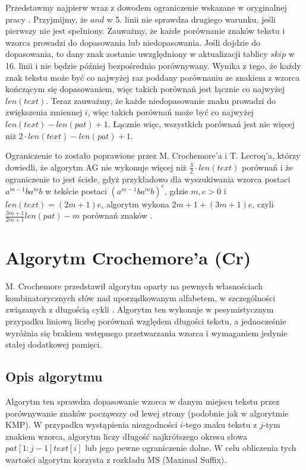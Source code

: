 Przedstawmy najpierw wraz z dowodem ograniczenie wskazane w oryginalnej pracy \cite{AG}. Przyjmijmy, że $and$ w 5. linii nie sprawdza drugiego warunku, jeśli pierwszy nie jest spełniony. Zauważmy, że każde porównanie znaków tekstu i wzorca prowadzi do dopasowania lub niedopasowania. Jeśli dojdzie do dopasowania, to dany znak zostanie uwzględniony w aktualizacji tablicy $skip$ w 16. linii i nie będzie później bezpośrednio porównywany. Wynika z tego, że każdy znak tekstu może być co najwyżej raz poddany porównaniu ze znakiem z wzorca kończącym się dopasowaniem, więc takich porównań jest łącznie co najwyżej $len(text)$. Teraz zauważmy, że każde niedopasowanie znaku prowadzi do zwiększenia zmiennej $i$, więc takich porównań może być co najwyżej $len(text) - len(pat) + 1$. Łącznie więc, wszystkich porównań jest nie więcej niż $2 \cdot len(text) - len(pat) + 1$.

Ograniczenie to zostało poprawione przez M. Crochemore'a i T. Lecroq'a, którzy dowiedli, że algorytm AG nie wykonuje więcej niż $\frac{3}{2} \cdot len(text)$ porównań i że ograniczenie to jest ścisłe, gdyż przykładowo dla wyszukiwania wzorca postaci $a^{m-1}ba^{m}b$ w tekście postaci $(a^{m-1}ba^{m}b)^{e}$, gdzie $m,e > 0$ i $len(text) = (2m+1)e$, algorytm wykona $2m+1+(3m+1)e$, czyli $\frac{3m+1}{2m+1}len(pat)-m$ porównań znaków \cite{AG-CrLc}.

\newpage
\section{Algorytm Crochemore'a (Cr)}
M. Crochemore przedstawił algorytm oparty na pewnych własnościach kombinatorycznych słów nad uporządkowanym alfabetem, w szczególności związanych z długością cykli \cite{Cr-or}. Algorytm ten wykonuje w pesymistycznym przypadku liniową liczbę porównań względem długości tekstu, a jednocześnie wyróżnia się brakiem wstępnego przetwarzania wzorca i wymaganiem jedynie stałej dodatkowej pamięci.

\subsection{Opis algorytmu}
Algorytm ten sprawdza dopasowanie wzorca w danym miejscu tekstu przez porównywanie znaków począwszy od lewej strony (podobnie jak w algorytmie KMP). W przypadku wystąpienia niezgodności $i$-tego znaku tekstu z $j$-tym znakiem wzorca, algorytm liczy długość najkrótszego okresu słowa $pat[1:j-1]text[i]$ lub jego pewne ograniczenie dolne. W celu obliczenia tych wartości algorytm korzysta z rozkładu MS (Maximal Suffix). 

